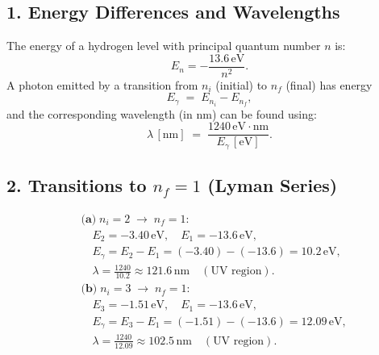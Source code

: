 \documentclass[12pt]{article}
\theoremstyle{definition} %
\theoremstyle{plain} %
\begin{document}
\subsection*{1. Energy Differences and Wavelengths}
\noindent
The energy of a hydrogen level with principal quantum number \(n\) is:
\[
E_n = -\frac{13.6\,\text{eV}}{n^2}.
\]
A photon emitted by a transition from \(n_i\) (initial) to \(n_f\) (final) has energy
\[
E_{\gamma} \;=\; E_{n_i} - E_{n_f},
\]
and the corresponding wavelength (in nm) can be found using:
\[
\lambda \,[\text{nm}] \;=\; \frac{1240\,\text{eV}\cdot\text{nm}}{E_{\gamma}\,[\text{eV}]}.
\]

\subsection*{2. Transitions to \texorpdfstring{$n_f=1$}{n=1} (Lyman Series)}
\[
\begin{aligned}
&\textbf{(a)}\; n_i = 2 \;\longrightarrow\; n_f = 1: \\
&\quad E_{2} = -3.40\,\text{eV}, \quad E_{1} = -13.6\,\text{eV}, \\
&\quad E_{\gamma} = E_{2} - E_{1} = (-3.40) - (-13.6) = 10.2\,\text{eV}, \\
&\quad \lambda = \frac{1240}{10.2} \approx 121.6\,\text{nm} \quad (\text{UV region}). \\[6pt]
&\textbf{(b)}\; n_i = 3 \;\longrightarrow\; n_f = 1: \\
&\quad E_{3} = -1.51\,\text{eV}, \quad E_{1} = -13.6\,\text{eV}, \\
&\quad E_{\gamma} = E_{3} - E_{1} = (-1.51) - (-13.6) = 12.09\,\text{eV}, \\
&\quad \lambda = \frac{1240}{12.09} \approx 102.5\,\text{nm} \quad (\text{UV region}).
\end{aligned}
\]
\end{document}
